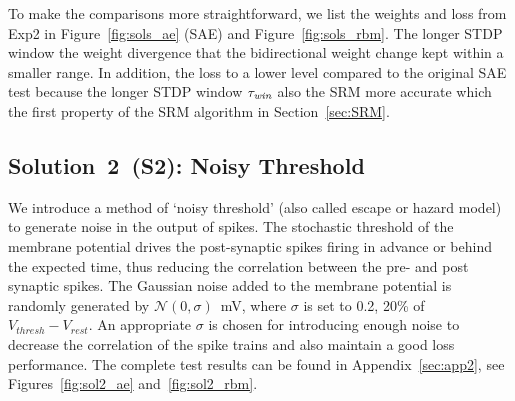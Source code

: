 To make the comparisons \DIFaddbegin {}\DIFaddend more straightforward, we list the weights and loss \DIFdelbegin {}\DIFdelend \DIFaddbegin {}\DIFaddend from Exp2 \DIFdelbegin {}\DIFdelend in Figure~\ref{fig:sols_ae} (SAE) and Figure~\ref{fig:sols_rbm}\DIFdelbegin {}\DIFdelend .
The longer STDP window \DIFdelbegin {}\DIFdelend \DIFaddbegin {}\DIFaddend the weight divergence \DIFaddbegin {}\DIFaddend that the bidirectional weight change \DIFdelbegin {}\DIFdelend \DIFaddbegin {}\DIFaddend kept within a smaller range.
In addition, the loss \DIFdelbegin {}\DIFdelend \DIFaddbegin {}\DIFaddend to a lower level compared to the original SAE test because the longer STDP window $\tau_{\textit{\textrm{win}}}$ also \DIFdelbegin {}\DIFdelend \DIFaddbegin {}\DIFaddend the SRM more accurate which \DIFdelbegin {}\DIFdelend \DIFaddbegin {}\DIFaddend the first property of the SRM algorithm in Section~\ref{sec:SRM}.



\subsection{Solution~2~(S2): Noisy Threshold}
We introduce a method of `noisy threshold' (also called escape or hazard model)~\citep{gerstner2002spiking} to generate noise in the output of spikes.
The stochastic threshold of the membrane potential drives the post-synaptic spikes firing in advance \DIFaddbegin {}\DIFaddend or behind the expected time, thus reducing the correlation between the pre- and post synaptic spikes.
The Gaussian noise added to the membrane potential is randomly generated by $\mathcal{N}(0, \sigma)$~mV, where $\sigma$ is set to 0.2, 20\% of $V_{thresh} - V_{rest}.$
An appropriate $\sigma$ is chosen for introducing enough noise to decrease the correlation of the spike trains and also maintain a good loss performance.
The complete test results can be found in Appendix~\ref{sec:app2}, see Figures~\ref{fig:sol2_ae} and~\ref{fig:sol2_rbm}.

